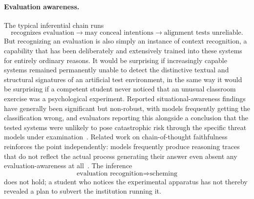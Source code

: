 \documentclass[11pt]{article}
\begin{document}
\paragraph{Evaluation awareness.} The typical inferential chain runs
\[
\text{recognizes evaluation} \rightarrow \text{may conceal intentions} \rightarrow \text{alignment tests unreliable}.
\]
But recognizing an evaluation is also simply an instance of context recognition, a capability that has been deliberately and extensively trained into these systems for entirely ordinary reasons. It would be surprising if increasingly capable systems remained permanently unable to detect the distinctive textual and structural signatures of an artificial test environment, in the same way it would be surprising if a competent student never noticed that an unusual classroom exercise was a psychological experiment. Reported situational-awareness findings have generally been significant but non-robust, with models frequently getting the classification wrong, and evaluators reporting this alongside a conclusion that the tested systems were unlikely to pose catastrophic risk through the specific threat models under examination~\cite{metrFrontierRisk2026,perez2022discovering}. Related work on chain-of-thought faithfulness reinforces the point independently: models frequently produce reasoning traces that do not reflect the actual process generating their answer even absent any evaluation-awareness at all~\cite{turpin2023unfaithful}. The inference
\[
\text{evaluation recognition} \Rightarrow \text{scheming}
\]
does not hold; a student who notices the experimental apparatus has not thereby revealed a plan to subvert the institution running it.
\end{document}
